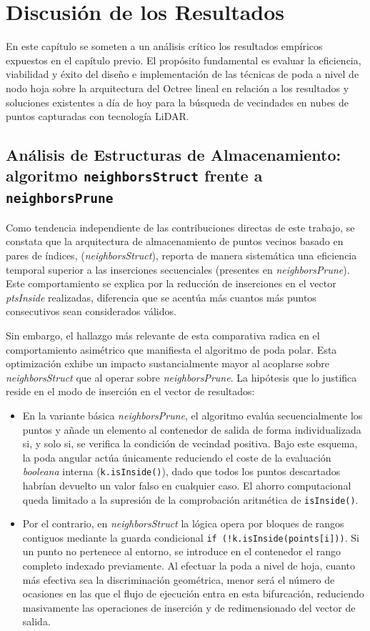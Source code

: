 \chapter{Discusión de los Resultados}
En este capítulo se someten a un análisis crítico los resultados empíricos expuestos en el capítulo previo. El propósito fundamental es evaluar la eficiencia, viabilidad y éxito del diseño e implementación de las técnicas de poda a nivel de nodo hoja sobre la arquitectura del Octree lineal en relación a los resultados y soluciones existentes a día de hoy para la búsqueda de vecindades en nubes de puntos capturadas con tecnología LiDAR.

\section{Análisis de Estructuras de Almacenamiento: algoritmo \texttt{neighborsStruct} frente a \texttt{neighborsPrune}}

Como tendencia independiente de las contribuciones directas de este trabajo, se constata que la arquitectura de almacenamiento de puntos vecinos basado en pares de índices, (\textit{neighborsStruct}), reporta de manera sistemática una eficiencia temporal superior a las inserciones secuenciales (presentes en \textit{neighborsPrune}). Este comportamiento se explica por la reducción de inserciones en el vector \textit{ptsInside} realizadas, diferencia que se acentúa más cuantos más puntos consecutivos sean considerados válidos.

Sin embargo, el hallazgo más relevante de esta comparativa radica en el comportamiento asimétrico que manifiesta el algoritmo de poda polar. Esta optimización exhibe un impacto sustancialmente mayor al acoplarse sobre \textit{neighborsStruct} que al operar sobre \textit{neighborsPrune}. La hipótesis que lo justifica reside en el modo de inserción en el vector de resultados:

\begin{itemize}
    \item En la variante básica \textit{neighborsPrune}, el algoritmo evalúa secuencialmente los puntos y añade un elemento al contenedor de salida de forma individualizada si, y solo si, se verifica la condición de vecindad positiva. Bajo este esquema, la poda angular actúa únicamente reduciendo el coste de la evaluación \textit{booleana} interna (\texttt{k.isInside()}), dado que todos los puntos descartados habrían devuelto un valor falso en cualquier caso. El ahorro computacional queda limitado a la supresión de la comprobación aritmética de \texttt{isInside()}.
    
    \item Por el contrario, en \textit{neighborsStruct} la lógica opera por bloques de rangos contiguos mediante la guarda condicional \texttt{if (!k.isInside(points[i]))}. Si un punto no pertenece al entorno, se introduce en el contenedor el rango completo indexado previamente. Al efectuar la poda a nivel de hoja, cuanto más efectiva sea la discriminación geométrica, menor será el número de ocasiones en las que el flujo de ejecución entra en esta bifurcación, reduciendo masivamente las operaciones de inserción y de redimensionado del vector de salida.
\end{itemize}

